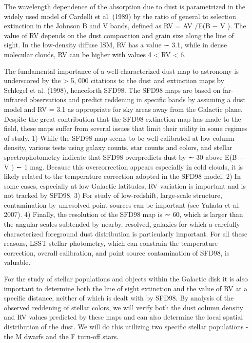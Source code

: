 The wavelength dependence of the absorption due to dust is parametrized in the widely used model
of Cardelli et al. (1989) by the ratio of general to selection extinction in the Johnson B and V
bands, defined as RV = AV /E(B − V ). The value of RV depends on the dust composition and
grain size along the line of sight. In the low-density diffuse ISM, RV has a value ∼ 3.1, while in
dense molecular clouds, RV can be higher with values 4 < RV < 6.

The fundamental importance of a well-characterized dust map to astronomy is underscored by the
> 5, 000 citations to the dust and extinction maps by Schlegel et al. (1998), henceforth SFD98.
The SFD98 maps are based on far-infrared observations and predict reddening in specific bands by
assuming a dust model and RV = 3.1 as appropriate for sky areas away from the Galactic plane.
Despite the great contribution that the SFD98 extinction map has made to the field, these maps
suffer from several issues that limit their utility in some regimes of study. 1) While the SFD98
map seems to be well calibrated at low column density, various tests using galaxy counts, star
counts and colors, and stellar spectrophotometry indicate that SFD98 overpredicts dust by ∼ 30%
above E(B − V ) ∼ 1 mag. Because this overcorrection appears especially in cold clouds, it is
likely related to the temperature correction adopted in the SFD98 model. 2) In some cases,
especially at low Galactic latitudes, RV variation is important and is not tracked by SFD98. 3)
For study of low-redshift, large-scale structure, contamination by unresolved point sources can be
important (see Yahata et al. 2007). 4) Finally, the resolution of the SFD98 map is ∼ 60, which
is larger than the angular scales subtended by nearby, resolved, galaxies for which a carefully
characterized foreground dust distribution is particularly important. For all these reasons, LSST
stellar photometry, which can constrain the temperature correction, overall calibration, and point
source contamination of SFD98, is valuable.

For the study of stellar populations and objects within the Galactic disk it is also important to
determine both the line of sight extinction and the value of RV at a specific distance, neither of
which is dealt with by SFD98. By analysis of the observed reddening of stellar colors, we will verify
both the dust column density and RV values predicted by these maps and can also determine the
local spatial distribution of the dust. We will do this utilizing two specific stellar populations - the
M dwarfs and the F turn-off stars.

